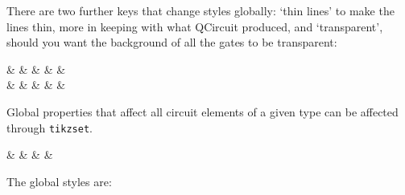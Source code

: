\documentclass[aps,pra,10pt,nofootinbib]{revtex4-2}
\begin{document}
There are two further keys that change styles globally: `thin lines' to make the lines thin, more in keeping with what QCircuit produced, and `transparent', should you want the background of all the gates to be transparent:
\begin{Code}
  \begin{quantikz}
    &  & &  & & \\
    & \targ{} &  & \targ{} &  & \meter{}
  \end{quantikz}
\end{Code}

Global properties that affect all circuit elements of a given type can be affected through \verb!tikzset!.
\begin{Code}
  \begin{quantikz}
    &  & \phase{\beta} &  & \meter{\ket{\pm}}
  \end{quantikz}
\end{Code}
The global styles are:
\end{document}
